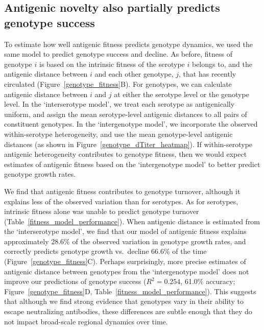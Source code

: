 \documentclass[11pt,oneside,letterpaper]{article}
\begin{document}
\subsection*{Antigenic novelty also partially predicts genotype success}
To estimate how well antigenic fitness predicts genotype dynamics, we used the same model to predict genotype success and decline.
As before, fitness of genotype $i$ is based on the intrinsic fitness of the serotype $i$ belongs to, and the antigenic distance between $i$ and each other genotype, $j$, that has recently circulated (Figure~\ref{genotype_fitness}B).
For genotypes, we can calculate antigenic distance between $i$ and $j$ at either the serotype level or the genotype level.
In the `interserotype model', we treat each serotype as antigenically uniform, and assign the mean serotype-level antigenic distances to all pairs of constituent genotypes.
In the `intergenotype model', we incorporate the observed within-serotype heterogeneity, and use the mean genotype-level antigenic distances (as shown in Figure~\ref{genotype_dTiter_heatmap}).
If within-serotype antigenic heterogeneity contributes to genotype fitness, then we would expect estimates of antigenic fitness based on the `intergenotype model' to better predict genotype growth rates.

We find that antigenic fitness contributes to genotype turnover, although it explains less of the observed variation than for serotypes.
As for serotypes, intrinsic fitness alone was unable to predict genotype turnover (Table~\ref{fitness_model_performance}).
When antigenic distance is estimated from the `interserotype model', we find that our model of antigenic fitness explains approximately 28.6\% of the observed variation in genotype growth rates, and correctly predicts genotype growth vs.\ decline 66.6\% of the time (Figure~\ref{genotype_fitness}C).
Perhaps surprisingly, more precise estimates of antigenic distance between genotypes from the `intergenotype model' does not improve our predictions of genotype success ($R^2 = 0.254$, 61.0\% accuracy; Figure~\ref{genotype_fitness}D, Table~\ref{fitness_model_performance}).
This suggests that although we find strong evidence that genotypes vary in their ability to escape neutralizing antibodies, these differences are subtle enough that they do not impact broad-scale regional dynamics over time.
\end{document}
